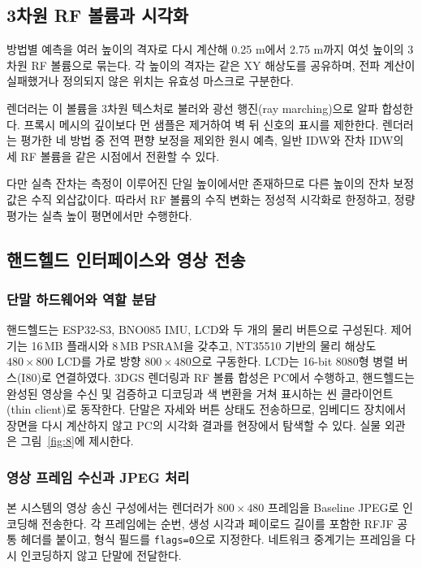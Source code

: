 \documentclass[11pt,a4paper]{article}
\begin{document}
\subsection{3차원 RF 볼륨과 시각화}
\label{sec:3.7}

방법별 예측을 여러 높이의 격자로 다시 계산해 0.25 m에서 2.75 m까지 여섯 높이의 3차원 RF 볼륨으로 묶는다. 각 높이의 격자는 같은 XY 해상도를 공유하며, 전파
계산이 실패했거나 정의되지 않은 위치는 유효성 마스크로 구분한다.

렌더러는 이 볼륨을 3차원 텍스처로 불러와 광선 행진(ray marching)으로 알파 합성한다. 프록시 메시의 깊이보다 먼 샘플은 제거하여 벽 뒤 신호의 표시를 제한한다.
렌더러는 평가한 네 방법 중 전역 편향 보정을 제외한 원시 예측, 일반 IDW와 잔차 IDW의 세 RF 볼륨을 같은 시점에서 전환할 수 있다.

다만 실측 잔차는 측정이 이루어진 단일 높이에서만 존재하므로 다른 높이의 잔차 보정값은 수직 외삽값이다. 따라서 RF 볼륨의 수직 변화는 정성적 시각화로 한정하고, 정량 평가는
실측 높이 평면에서만 수행한다.

\subsection{핸드헬드 인터페이스와 영상 전송}
\label{sec:3.8}

\subsubsection{단말 하드웨어와 역할 분담}

핸드헬드는 ESP32-S3, BNO085 IMU, LCD와 두 개의 물리 버튼으로 구성된다. 제어기는 16\,MB 플래시와
8\,MB PSRAM을 갖추고, NT35510 기반의 물리 해상도 $480\times800$ LCD를 가로 방향
$800\times480$으로 구동한다. LCD는 16-bit 8080형 병렬 버스(I80)로 연결하였다. 3DGS 렌더링과 RF 볼륨
합성은 PC에서 수행하고, 핸드헬드는 완성된 영상을 수신 및 검증하고 디코딩과 색 변환을 거쳐 표시하는 씬 클라이언트
(thin client)로 동작한다. 단말은 자세와 버튼 상태도 전송하므로, 임베디드 장치에서 장면을 다시 계산하지
않고 PC의 시각화 결과를 현장에서 탐색할 수 있다. 실물 외관은 그림~\ref{fig:8}에 제시한다.

\subsubsection{영상 프레임 수신과 JPEG 처리}

본 시스템의 영상 송신 구성에서는 렌더러가 $800\times480$ 프레임을 Baseline JPEG로 인코딩해 전송한다.
각 프레임에는 순번, 생성 시각과 페이로드 길이를 포함한 RFJF 공통 헤더를 붙이고, 형식 필드를
\texttt{flags=0}으로 지정한다.
네트워크 중계기는 프레임을 다시 인코딩하지 않고 단말에 전달한다.
\end{document}
